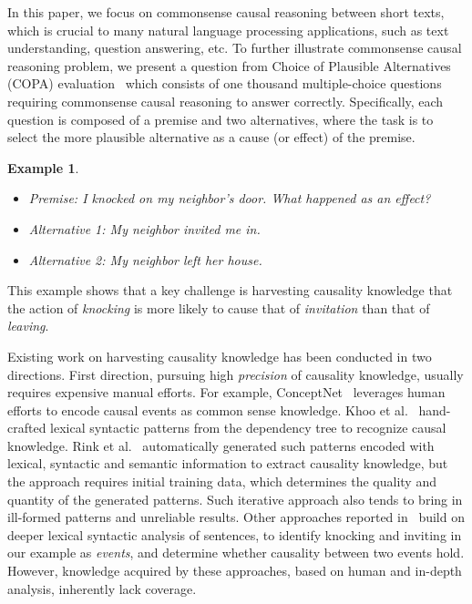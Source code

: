 \documentclass[letterpaper]{article}
\newtheorem{example}{Example}
\begin{document}
In this paper, we focus on commonsense causal reasoning between short texts,
which is crucial to many natural language processing applications,
such as text understanding, question answering, etc.
To further illustrate commonsense causal reasoning problem,
we present a question from Choice of Plausible Alternatives (COPA)
evaluation~\cite{roemmele2011choice}
which consists of one thousand multiple-choice questions requiring
commonsense causal reasoning to answer correctly.
Specifically, each question is composed of a premise and two
alternatives, where the task is to select the more plausible
alternative as a cause (or effect) of the premise.

\begin{example}
\label{ex:copa}
\begin{itemize}
\item[] Premise: \emph{I knocked on my neighbor's door.} What
happened as an effect?
\item[] Alternative 1: \emph{My neighbor invited me in.}
\item[] Alternative 2: \emph{My neighbor left her house.}
\end{itemize}
\end{example}

This example shows that a key challenge is
harvesting causality knowledge that the action of
{\em knocking} is more likely to cause that of {\em invitation}
than that of {\em leaving}.

Existing work on harvesting causality knowledge has been conducted in
two directions.
First direction, pursuing high {\em precision} of
causality knowledge, usually requires expensive manual efforts.
For example, ConceptNet~\cite{HavasiSALAM10} leverages human efforts
to encode causal events as common sense knowledge.
Khoo et al.~ hand-crafted
lexical syntactic patterns from the dependency tree to recognize
causal knowledge.  Rink et al.~
automatically generated such patterns encoded with
lexical, syntactic and semantic information to extract
causality knowledge, but the approach requires initial training data,
which determines the quality and quantity of the generated patterns.
Such iterative approach also tends to bring in ill-formed patterns
and unreliable results.
Other approaches reported in~\cite{gordon2012copa} build on deeper
lexical syntactic analysis of sentences,
to identify knocking and inviting in our example as
\emph{events}, and determine whether causality between two events hold.
However, knowledge acquired by these approaches,
based on human and in-depth analysis, inherently lack coverage.
\end{document}
